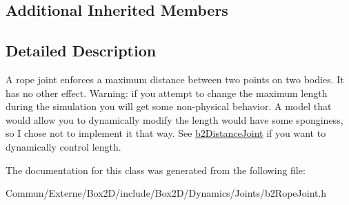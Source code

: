 \subsection*{Additional Inherited Members}


\subsection{Detailed Description}
A rope joint enforces a maximum distance between two points on two bodies. It has no other effect. Warning\+: if you attempt to change the maximum length during the simulation you will get some non-\/physical behavior. A model that would allow you to dynamically modify the length would have some sponginess, so I chose not to implement it that way. See \hyperlink{classb2_distance_joint}{b2\+Distance\+Joint} if you want to dynamically control length. 

The documentation for this class was generated from the following file\+:\begin{DoxyCompactItemize}
\item 
Commun/\+Externe/\+Box2\+D/include/\+Box2\+D/\+Dynamics/\+Joints/b2\+Rope\+Joint.\+h\end{DoxyCompactItemize}
